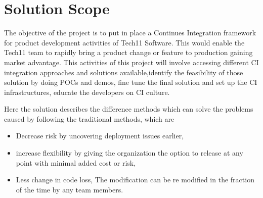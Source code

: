 \documentclass[12pt,a4paper,oneside]{report}
\begin{document}
\section{Solution Scope}
The objective of the project is to put in place a Continues Integration framework for
product development activities of Tech11 Software. This would enable the Tech11 team to
rapidly bring a product change or feature to production gaining market advantage. This activities
of this project will involve accessing different CI integration approaches and solutions
available,identify the feasibility of those solution by doing POCs and demos, fine tune the final
solution and set up the CI infrastructures, educate the developers on CI culture.
\par Here the solution describes the difference methods which can solve the problems caused by following the traditional methods, which are
\begin{itemize}
\item  Decrease risk by uncovering deployment issues earlier,
\item increase flexibility by giving the organization the option to release at any point with minimal added cost or risk,
\item Less change in code loss, The modification can be re modified in the fraction of the time by any team members. 
\end{itemize}
\end{document}

